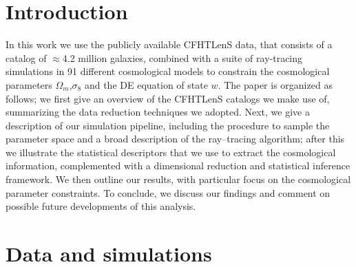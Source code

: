 \documentclass[reprint,aps,prd,superscriptaddress,showkeys,showpacs]{revtex4-1}
\begin{document}
\maketitle



\section{Introduction}
In this work we use the publicly available CFHTLenS data, that consists of a catalog of $\approx$4.2 million galaxies, combined with a suite of ray-tracing simulations in 91 different cosmological models to constrain the cosmological parameters $\Omega_m$,$\sigma_8$ and the DE equation of state $w$. The paper is organized as follows; we first give an overview of the CFHTLenS catalogs we make use of, summarizing the data reduction techniques we adopted. Next, we give a description of our simulation pipeline, including the procedure to sample the parameter space and a broad description of the ray--tracing algorithm; after this we illustrate the statistical descriptors that we use to extract the cosmological information, complemented with a dimensional reduction and statistical inference framework. We then outline our results, with particular focus on the cosmological parameter constraints. To conclude, we discuss our findings and comment on possible future developments of this analysis.  


\section{Data and simulations}
\end{document}
